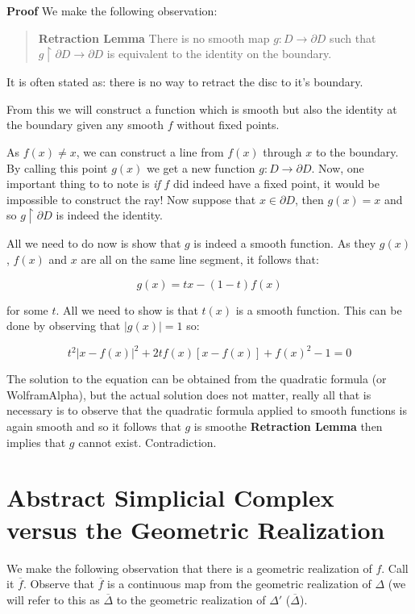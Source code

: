 \documentclass[letterpaper,12pt]{article}
\newcommand{\ol}{\overline}
\begin{document}
\textbf{Proof} We make the following observation: 

\begin{quote}
    \textbf{Retraction Lemma} There is no smooth map $g : D \to \partial D$ such that $g \upharpoonright \partial D \to \partial D$ is equivalent to the identity on the boundary.
\end{quote}

It is often stated as: there is no way to retract the disc to it's boundary.

From this we will construct a function which is smooth but also the identity at the boundary given any smooth $f$ without fixed points.

As $f(x) \neq x$, we can construct a line from $f(x)$ through $x$ to the boundary. By calling this point $g(x)$ we get a new function $g : D \to \partial D$. Now, one important thing to to note is \textit{if} $f$ did indeed have a fixed point, it would be impossible to construct the ray! Now suppose that $x \in \partial D$, then $g(x) = x$ and so $g \upharpoonright \partial D$ is indeed the identity.

All we need to do now is show that $g$ is indeed a smooth function. As they $g(x)$, $f(x)$ and $x$ are all on the same line segment, it follows that:

$$g(x) = tx - (1 - t)f(x)$$

for some $t$. All we need to show is that $t(x)$ is a smooth function. This can be done by observing that $|g(x)| = 1$ so:

$$t^2|x - f(x)|^2 + 2tf(x)[x - f(x)] + f(x)^2 - 1 = 0$$

The solution to the equation can be obtained from the quadratic formula (or WolframAlpha), but the actual solution does not matter, really all that is necessary is to observe that the quadratic formula applied to smooth functions is again smooth and so it follows that $g$ is smoothe \textbf{Retraction Lemma} then implies that $g$ cannot exist. Contradiction.

\section{Abstract Simplicial Complex versus the Geometric Realization}

We make the following observation that there is a geometric realization of $f$. Call it $\ol{f}$. Observe that $\ol{f}$ is a continuous map from the geometric realization of $\Delta$ (we will refer to this as $\ol{\Delta}$ to the geometric realization of $\Delta'$ ($\ol{\Delta}$).
\end{document}
